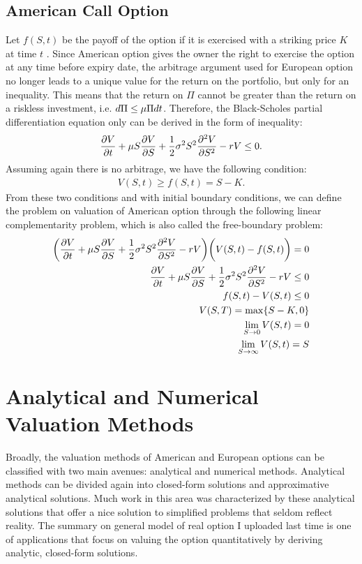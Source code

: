 \documentclass[11pt,letter]{article}
\theoremstyle{definition}
\theoremstyle{remark}
\numberwithin{equation}{section}
\begin{document}
\subsection{American Call Option}
Let $f(S,t)$ be the payoff of the option if it is exercised with a striking price $K$ at time $t$ . Since American option gives the owner the right to exercise the option at any time before expiry date, the arbitrage argument used for European option no longer leads to a unique value for the return on the portfolio, but only for an inequality. This means that the return on $\Pi$ cannot be greater than the return on a riskless investment, i.e. $d\Pi\le \mu\Pi dt$. Therefore, the Black-Scholes partial differentiation equation only can be derived in the form of inequality:
\begin{align}
    \frac{\partial V}{\partial t}+\mu S\frac{\partial V}{\partial S}+\frac{1}{2}\sigma^2S^2\frac{\partial^2V}{\partial S^2}-r V\le0.
\end{align}
Assuming again there is no arbitrage, we have the following condition:
\begin{align}
    V(S,t)\ge f(S,t)=S-K.
\end{align}
From these two conditions and with initial boundary conditions, we can define the problem on valuation of American option through the following linear complementarity problem, which is also called the free-boundary problem:
\begin{align}
    \bigg(\frac{\partial V}{\partial t}+\mu S\frac{\partial V}{\partial S}+\frac{1}{2}\sigma^2S^2\frac{\partial^2V}{\partial S^2}-r V\bigg)\bigg(V(S,t)-f(S,t)\bigg)=0\\
    \frac{\partial V}{\partial t}+\mu S\frac{\partial V}{\partial S}+\frac{1}{2}\sigma^2S^2\frac{\partial^2V}{\partial S^2}-rV\le0\\
    f(S,t)-V(S,t)\le0\\
    V(S,T)=\max\{S-K,0\}\\
    \lim_{S\rightarrow0}V(S,t)=0\\
    \lim_{S\rightarrow\infty}V(S,t)=S
\end{align}


\section{Analytical and Numerical Valuation Methods}
Broadly, the valuation methods of American and European options can be classified with two main avenues: analytical and numerical methods. Analytical methods can be divided again into closed-form solutions and approximative analytical solutions. Much work in this area was characterized by these analytical solutions that offer a nice solution to simplified problems that seldom reflect reality. The summary on general model of real option I uploaded last time is one of applications that focus on valuing the option quantitatively by deriving analytic, closed-form solutions.
\end{document}
